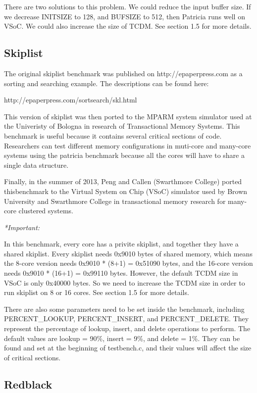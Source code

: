 \documentclass{article}
\begin{document}
There are two solutions to this problem. We could reduce the input buffer size. If we decrease INITSIZE to 128, and BUFSIZE to 512, then Patricia runs well on VSoC. We could also increase the size of TCDM. See section 1.5 for more details.

\subsection{Skiplist}

The original skiplist benchmark was published on http://epaperpress.com
as a sorting and searching example. The descriptions can be found here:

http://epaperpress.com/sortsearch/skl.html

This version of skiplist was then ported to the MPARM system simulator used at 
the Univeristy of Bologna in research of Transactional Memory Systems. This
benchmark is useful because it contains several critical sections of code. 
Researchers can test different memory configurations in muti-core and 
many-core systems using the patricia benchmark because all the cores will have 
to share a single data structure. 

Finally, in the summer of 2013, Peng and Callen (Swarthmore College) ported 
thisbenchmark to the Virtual System on Chip (VSoC) simulator used by Brown 
University and Swarthmore College in transactional memory research for 
many-core clustered systems. 

\vspace{2mm}
\emph{*Important:} 

In this benchmark, every core has a privite skiplist, and together they have a
shared skiplist. Every skiplist needs 0x9010 bytes of shared memory, which 
means the 8-core version needs 0x9010 * (8+1) = 0x51090 bytes,
and the 16-core version needs 0x9010 * (16+1) = 0x99110 bytes. However, the 
default TCDM size in VSoC is only 0x40000 bytes. So we need to 
increase the TCDM size in order to run skiplist on 8 or 16 cores.
 See section 1.5 for more details.

There are also some parameters need to be set inside the benchmark, including 
 PERCENT\_LOOKUP, PERCENT\_INSERT, and PERCENT\_DELETE. They 
represent the percentage of lookup, insert, and delete operations to perform.
The default values are lookup = 90\%, insert = 9\%, and 
delete = 1\%. They can be found and set at the beginning of testbench.c,
and their values will affect the size of critical sections. 

\subsection{Redblack}
\end{document}
